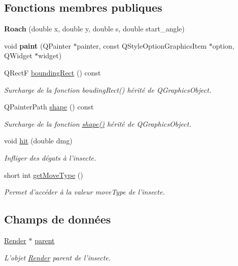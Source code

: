 \subsection*{Fonctions membres publiques}
\begin{DoxyCompactItemize}
\item 
\hypertarget{classRoach_af12999aec092cc5dc1afb0c3f85ee353}{
{\bfseries Roach} (double x, double y, double s, double start\_\-angle)}
\label{classRoach_af12999aec092cc5dc1afb0c3f85ee353}

\item 
\hypertarget{classRoach_a13a922274476d77e17405cbe199ce691}{
void {\bfseries paint} (QPainter $\ast$painter, const QStyleOptionGraphicsItem $\ast$option, QWidget $\ast$widget)}
\label{classRoach_a13a922274476d77e17405cbe199ce691}

\item 
QRectF \hyperlink{classBug_a9b39c25361faad07b1bf2dd927d09dab}{boundingRect} () const 
\begin{DoxyCompactList}\small\item\em Surcharge de la fonction boudingRect() hérité de QGraphicsObject. \end{DoxyCompactList}\item 
QPainterPath \hyperlink{classBug_a587a36d3145c2b4dba6c689af22c65ac}{shape} () const 
\begin{DoxyCompactList}\small\item\em Surcharge de la fonction \hyperlink{classBug_a587a36d3145c2b4dba6c689af22c65ac}{shape()} hérité de QGraphicsObject. \end{DoxyCompactList}\item 
void \hyperlink{classBug_a63402c05b5ba3fb034e41f1ced0e4b9f}{hit} (double dmg)
\begin{DoxyCompactList}\small\item\em Infliger des dégats à l'insecte. \end{DoxyCompactList}\item 
short int \hyperlink{classBug_aced471cedcfa855baddf4c827003e755}{getMoveType} ()
\begin{DoxyCompactList}\small\item\em Permet d'accéder à la valeur moveType de l'insecte. \end{DoxyCompactList}\end{DoxyCompactItemize}
\subsection*{Champs de données}
\begin{DoxyCompactItemize}
\item 
\hyperlink{classRender}{Render} $\ast$ \hyperlink{classBug_a7a93aae4e4b7a215c94ff85d0bd6e26d}{parent}
\begin{DoxyCompactList}\small\item\em L'objet \hyperlink{classRender}{Render} parent de l'insecte. \end{DoxyCompactList}\end{DoxyCompactItemize}
